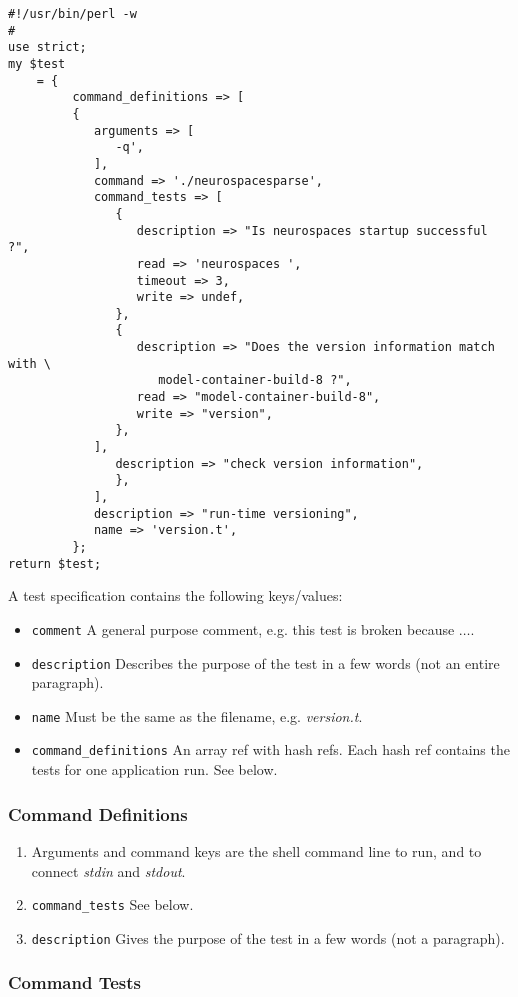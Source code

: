 \documentclass[12pt]{article}
\begin{document}
\begin{verbatim}
#!/usr/bin/perl -w
#
use strict;
my $test
    = {
         command_definitions => [
         {
            arguments => [
               -q',
            ],
            command => './neurospacesparse',
            command_tests => [
               {
                  description => "Is neurospaces startup successful ?",
                  read => 'neurospaces ',
                  timeout => 3,
                  write => undef,
               },
               {
                  description => "Does the version information match with \
                     model-container-build-8 ?",
                  read => "model-container-build-8",
                  write => "version",
               },
            ],
               description => "check version information",
               },
            ],
            description => "run-time versioning",
            name => 'version.t',
         };
return $test;
\end{verbatim}
A test specification contains the following keys/values:
\begin{itemize}
\item {\tt comment} A general purpose comment, e.g. this test is broken because $\ldots$.
\item {\tt description} Describes the purpose of the test in a few words (not an entire paragraph).
\item {\tt name} Must be the same as the filename, e.g. {\it version.t}.
\item {\tt command\_definitions} An array ref with hash refs. Each hash ref contains the tests for one application run. See below. 
\end{itemize}

\subsubsection*{Command Definitions}

\begin{enumerate}
\item Arguments and command keys are the shell command line to run, and to connect {\it stdin} and {\it stdout}.
\item  {\tt command\_tests} See below.
\item {\tt description} Gives the purpose of the test in a few words (not a paragraph). 
\end{enumerate}

\subsubsection*{Command Tests}
\end{document}
